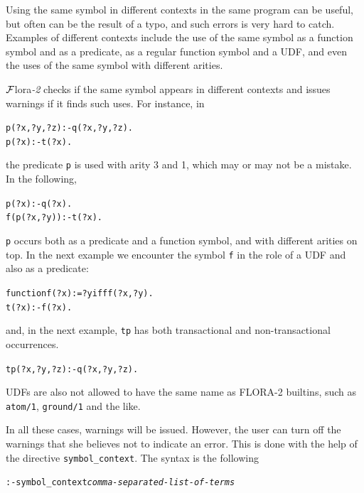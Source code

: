 \documentclass[11pt]{article}
\newcommand{\FLORA}{{\mbox{\sc ${\cal F}${lora}\rm\emph{-2}}}\xspace}
\begin{document}
Using the same symbol in different contexts in the same program can be
useful, but often can be the result of a typo, and such errors is very hard
to catch. Examples of different contexts include the use of the same symbol
as a function symbol and as a predicate, as a regular function symbol and a
UDF, and even the uses of the same symbol with different arities.

\FLORA checks if the same symbol appears in different contexts
and issues warnings if it finds such uses. For instance, in
\begin{alltt}
	p(?x,?y,?z):-q(?x,?y,?z).
	p(?x):-t(?x).
\end{alltt}
the predicate \texttt{p} is used with arity 3 and 1, which may or may not be a
mistake. In the following,
\begin{alltt}
	p(?x):-q(?x).
	f(p(?x,?y)):-t(?x).
\end{alltt}
\texttt{p} occurs both as a predicate and a function symbol, and with
different arities on top. In the next example we encounter the symbol
\texttt{f} in the role of a UDF and also as a predicate:  
\begin{alltt}
	function f(?x):=?y if ff(?x,?y).
	t(?x):-f(?x).
\end{alltt}
and, in the next example, \texttt{tp} has both transactional and
non-transactional occurrences. 
\begin{alltt}
	tp(?x,?y,?z):-q(?x,?y,?z).
\end{alltt}
UDFs are also not allowed to have the same name as FLORA-2 builtins, such
as \texttt{atom/1}, \texttt{ground/1} and the like.  


In all these cases, warnings will be issued. However, the user can turn off
the warnings that she believes not to indicate an error. This is done with
the help of the directive
\texttt{symbol\_context}.  The syntax is the following
\begin{alltt}
:- symbol_context \textnormal{\emph{comma-separated-list-of-terms}}
\end{alltt}
\end{document}
